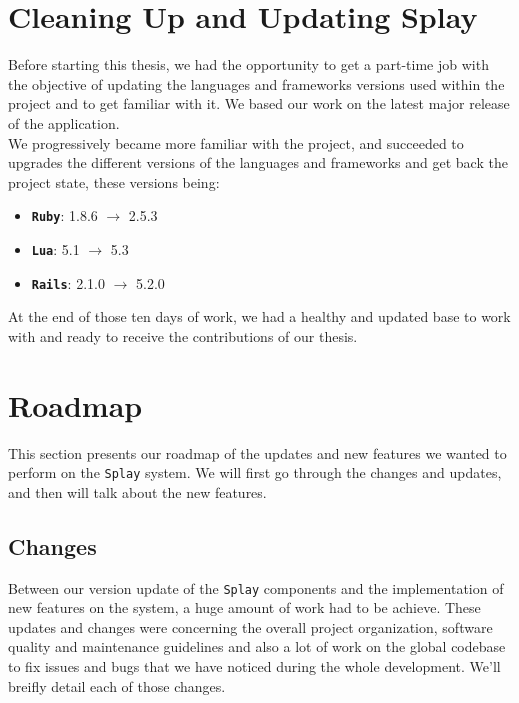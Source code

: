 \documentclass{eplmastersthesis}
\begin{document}
    \section{Cleaning Up and Updating Splay}

      Before starting this thesis, we had the opportunity to get a part-time
      job with the objective of updating the languages and frameworks versions
      used within the project and to get familiar with it. We based our work on
      the latest major release of the application.\\

      We progressively became more familiar with the project, and succeeded
      to upgrades the different versions of the languages and frameworks and
      get back the project state, these versions being:

      \begin{itemize}
        \item \textbf{\texttt{Ruby}}: 1.8.6 $\rightarrow$ 2.5.3
        \item \textbf{\texttt{Lua}}: 5.1 $\rightarrow$ 5.3
        \item \textbf{\texttt{Rails}}: 2.1.0 $\rightarrow$ 5.2.0
      \end{itemize}

      At the end of those ten days of work, we had a healthy and updated %
      base to work with and ready to receive the contributions of our thesis.

    \section{Roadmap}

      This section presents our roadmap of the updates and new features
      we wanted to perform on the \texttt{Splay} system. We will first go through
      the changes and updates, and then will talk about the new features.

      \subsection{Changes}

        Between our version update of the \texttt{Splay} components and the
        implementation of new features on the system, a huge amount of
        work had to be achieve. These updates and changes were concerning
        the overall project organization, software quality and maintenance
        guidelines and also a lot of work on the global codebase to fix %
        issues and bugs that we have noticed during the whole development.
        We'll breifly detail each of those changes.
\end{document}
